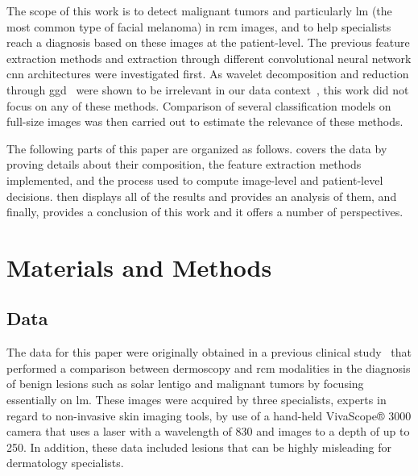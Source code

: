\documentclass[journal,article,accept,moreauthors,pdftex, applsci]{Definitions/mdpi}
\begin{document}
The scope of this work is to detect malignant tumors and particularly \ac{lm} (the most common type of facial melanoma) in \ac{rcm} images, and to help specialists reach a diagnosis based on these images at the patient-level. The previous feature extraction methods and extraction through different convolutional neural network \ac{cnn} architectures were investigated first. As wavelet decomposition and reduction through \ac{ggd}~\cite{Halimi2017a} were shown to be irrelevant in our data context~\cite{Cendre2019a}, this work did not focus on any of these methods. Comparison of several classification models on full-size images was then carried out to estimate the relevance of these methods.\par
The following parts of this paper are organized as follows.  covers the data by proving details about their composition, the feature extraction methods implemented, and the process used to compute image-level and patient-level decisions.  then displays all of the results and provides an analysis of them, and finally,  provides a conclusion of this work and it offers a number of perspectives.\par

\section{Materials and Methods}
\label{sec:material}

\subsection{Data}
\label{sec:data}
The data for this paper were originally obtained in a previous clinical study~\cite{Cinotti2018} that performed a comparison between dermoscopy and \ac{rcm} modalities in the diagnosis of benign lesions such as solar lentigo and malignant tumors by focusing essentially on \ac{lm}. These images were acquired by three specialists, experts in regard to non-invasive skin imaging tools, by use of a hand-held VivaScope® 3000 camera that uses a laser with a wavelength of \unit{830}{\nano\meter} and images to a depth of up to \unit{250}{\micro\meter}. In addition, these data included lesions that can be highly misleading for dermatology specialists.\par
\end{document}

